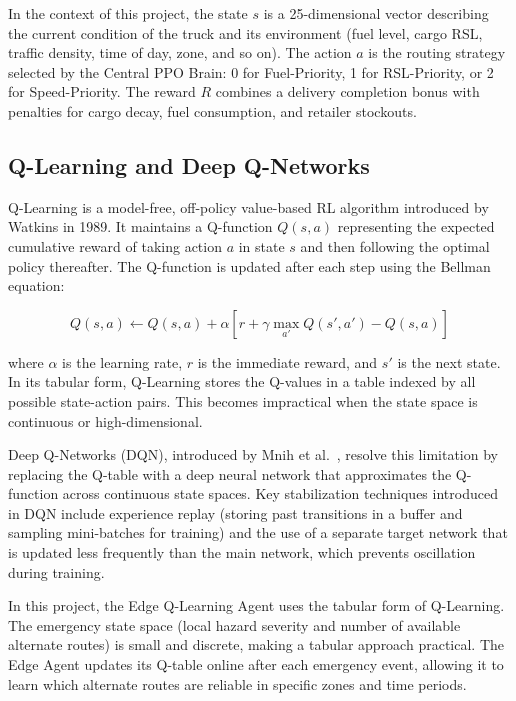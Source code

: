 In the context of this project, the state $s$ is a 25-dimensional vector
describing the current condition of the truck and its environment (fuel level,
cargo RSL, traffic density, time of day, zone, and so on). The action $a$ is the
routing strategy selected by the Central PPO Brain: 0 for Fuel-Priority, 1 for
RSL-Priority, or 2 for Speed-Priority. The reward $R$ combines a delivery
completion bonus with penalties for cargo decay, fuel consumption, and retailer
stockouts.

\subsection{Q-Learning and Deep Q-Networks}

Q-Learning is a model-free, off-policy value-based RL algorithm introduced by
Watkins in 1989. It maintains a Q-function $Q(s, a)$ representing the expected
cumulative reward of taking action $a$ in state $s$ and then following the optimal
policy thereafter. The Q-function is updated after each step using the Bellman
equation:

\begin{equation}
    Q(s, a) \leftarrow Q(s, a) + \alpha \left[ r + \gamma \max_{a'} Q(s', a') - Q(s, a) \right]
\end{equation}

where $\alpha$ is the learning rate, $r$ is the immediate reward, and $s'$ is the
next state. In its tabular form, Q-Learning stores the Q-values in a table indexed
by all possible state-action pairs. This becomes impractical when the state space
is continuous or high-dimensional.

Deep Q-Networks (DQN), introduced by Mnih et al.\ \cite{mnih2015}, resolve this
limitation by replacing the Q-table with a deep neural network that approximates
the Q-function across continuous state spaces. Key stabilization techniques
introduced in DQN include experience replay (storing past transitions in a buffer
and sampling mini-batches for training) and the use of a separate target network
that is updated less frequently than the main network, which prevents oscillation
during training.

In this project, the Edge Q-Learning Agent uses the tabular form of Q-Learning.
The emergency state space (local hazard severity and number of available alternate
routes) is small and discrete, making a tabular approach practical. The Edge Agent
updates its Q-table online after each emergency event, allowing it to learn which
alternate routes are reliable in specific zones and time periods.

